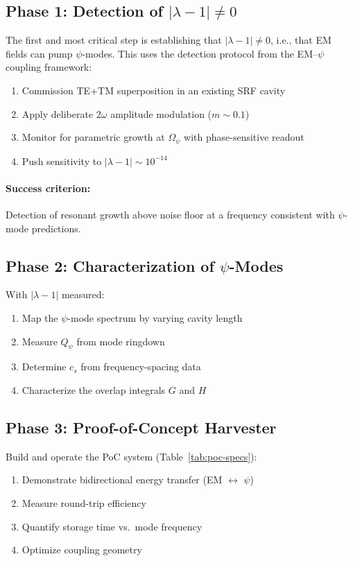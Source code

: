 \documentclass[aps,prd,twocolumn,showpacs,preprintnumbers,superscriptaddress,nofootinbib]{revtex4-2}
\begin{document}
\subsection{Phase 1: Detection of $|\lambda-1| \neq 0$}\label{sec:phase1}

The first and most critical step is establishing that $|\lambda-1| \neq 0$,
i.e., that EM fields can pump $\psi$-modes.  This uses the detection
protocol from the EM--$\psi$ coupling framework:

\begin{enumerate}
\item Commission TE+TM superposition in an existing SRF cavity
\item Apply deliberate $2\omega$ amplitude modulation ($m\sim 0.1$)
\item Monitor for parametric growth at $\Omega_\psi$ with phase-sensitive
readout
\item Push sensitivity to $|\lambda-1| \sim 10^{-14}$
\end{enumerate}

\paragraph{Success criterion:} Detection of resonant growth above
noise floor at a frequency consistent with $\psi$-mode predictions.

\subsection{Phase 2: Characterization of $\psi$-Modes}\label{sec:phase2}

With $|\lambda-1|$ measured:
\begin{enumerate}
\item Map the $\psi$-mode spectrum by varying cavity length
\item Measure $Q_\psi$ from mode ringdown
\item Determine $c_s$ from frequency-spacing data
\item Characterize the overlap integrals $G$ and $H$
\end{enumerate}

\subsection{Phase 3: Proof-of-Concept Harvester}\label{sec:phase3}

Build and operate the PoC system (Table~\ref{tab:poc-specs}):
\begin{enumerate}
\item Demonstrate bidirectional energy transfer (EM $\leftrightarrow$ $\psi$)
\item Measure round-trip efficiency
\item Quantify storage time vs.\ mode frequency
\item Optimize coupling geometry
\end{enumerate}
\end{document}
